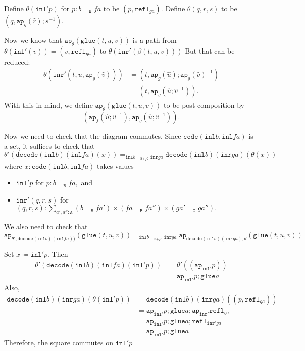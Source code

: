 \message{ !name(notes.tex)}\documentclass[12pt]{amsart}
\newcommand{\bydef}{\coloneqq}
\newcommand{\type}[1]{\mathtt{#1}}
\newcommand{\tin}{\colon}
\newcommand{\A}{\type{A}}
\newcommand{\B}{\type{B}}
\newcommand{\C}{\type{C}}
\newcommand{\BAC}{\B +_{\A} \C}
\newcommand{\ap}{\type{ap}}
\newcommand{\inl}{\type{inl}}
\newcommand{\inr}{\type{inr}}
\newcommand{\glue}{\type{glue}}
\newcommand{\refl}{\type{refl}}
\newcommand{\code}{\type{code}}
\newcommand{\decode}{\type{decode}}
\theoremstyle{remark}
\theoremstyle{definition}
\begin{document}
Define
\(
  \theta (\inl' p)
\)
for
\(
  p \tin b=_\B fa
\)
to be
\(
  ( p , \refl_{ga} ).
\)
Define
\(
  \theta ( q,r,s )
\)
to be
\(
  ( q , \ap_g ( \hat{r} ) ; s^{-1} ).
\)

Now we know that
\(
  \ap_{ \theta } ( \glue ( t,u,v ) )
\)
is a path from
\(
  \theta ( \inl' ( v ) ) = ( v , \refl_{ga} )
\)
to
\(
  \theta ( \inr' ( \beta ( t,u,v ) ) )
\)
But that can be reduced:
%
\begin{align*}
  \theta ( \inr' ( t,u,\ap_{g}(\hat{v}) ) )
  & = ( t, \ap_g ( \hat{u} ); \ap_g ( \hat{v} )^{-1} ) \\
  & = ( t, \ap_g ( \hat{u} ; \hat{v}^{-1}) ).
\end{align*}
% 
With this in mind, we define
\(
  \ap_{\theta} ( \glue ( t,u,v ) )
\)
to be post-composition by
\[
  ( \ap_f ( \hat{u};\hat{v}^{-1} ) , \ap_g ( \hat{u};\hat{v}^{-1} ) ).
\]

Now we need to check that the diagram commutes.  Since
\(
  \code ( \inl b , \inl fa )
\)
is a set, it suffices to check that
\[
  \theta' ( \decode (\inl b ) ( \inl fa ) ( x ) )
    =_{ \inl b =_{\BAC} \inr ga }
    \decode ( \inl b )(\inr ga) ( \theta ( x ) )
\]
where
\(
  x \tin \code ( \inl b, \inl fa )
\)
takes values
%
\begin{itemize}
\item
  \(
    \inl' p
  \)
  for
  \(
    p \tin b=_\B fa,
  \)
  and
\item
  \(
    \inr' ( q,r,s )
  \)
  for
  \(
    ( q,r,s ) \tin
      \sum\limits_{a',a'' \tin \A}
      (b=_\B fa') \times ( fa =_\B fa'' )\times ( ga'=_\C ga'' ).
  \)
\end{itemize}
%
We also need to check that
\[
  \ap_{ \theta' ; \decode ( \inl b ) ( \inl fa ) )} ( \glue ( t,u,v ) ) 
    =_{ \inl b =_{\BAC} \inr ga }
    \ap_{ \decode ( \inl b )(\inr ga) ; \theta } ( \glue ( t,u,v ) ) 
\]

Set
\(
  x \bydef \inl' p.
\)
Then
%
\begin{align*}
  \theta' ( \decode ( \inl b ) ( \inl fa ) ( \inl' p ) )
  & = \theta' ( ( \ap_{\inl'} p ) ) \\
  & = \ap_{\inl'} p ; \glue a
\end{align*}
%
Also,
%
\begin{align*}
  \decode ( \inl b ) ( \inr ga ) ( \theta ( \inl' p ) )
  & = \decode ( \inl b ) ( \inr ga ) ( ( p,\refl_{ga} ) ) \\
  & = \ap_{\inl'} p ; \glue a ; \ap_{\inr'} \refl_{ga} \\
  & = \ap_{\inl'} p ; \glue a ; \refl_{\inr' ga} \\
  & = \ap_{\inl'} p ; \glue a
\end{align*}
%
Therefore, the square commutes on \( \inl' p \)
\end{document}
